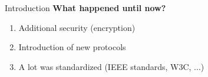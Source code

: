 \begin{frame}{Introduction}
    \textbf{What happened until now?}
    \begin{enumerate}
        \item<1-> Additional security (encryption)
        \item<2-> Introduction of new protocols
        \item<3> A lot was standardized (IEEE standards, W3C, ...)
    \end{enumerate}
\end{frame}
